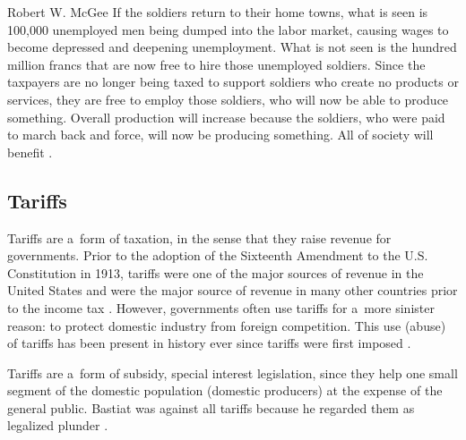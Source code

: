 \begin{artengenv}{Robert W. McGee}
If the soldiers return to their home towns, what is seen is 100,000 unemployed men being dumped into the labor market, causing wages to become depressed and deepening unemployment. What is not seen is the hundred million francs that are now free to hire those unemployed soldiers. Since the taxpayers are no longer being taxed to support soldiers who create no products or services, they are free to employ those soldiers, who will now be able to produce something. Overall production will increase because the soldiers, who were paid to march back and force, will now be producing something. All of society will benefit 
\parencite[][pp.6–7]{bastiat_selected_1964}.%




\subsection{Tariffs }



Tariffs are a~form of taxation, in the sense that they raise revenue for governments. Prior to the adoption of the Sixteenth Amendment to the U.S. Constitution in 1913, tariffs were one of the major sources of revenue in the United States and were the major source of revenue in many other countries prior to the income tax 
\parencite[][pp.269–270]{webber_history_1986}. %
 However, governments often use tariffs for a~more sinister reason: to protect domestic industry from foreign competition. This use (abuse) of tariffs has been present in history ever since tariffs were first imposed 
\parencite[][]{webber_history_1986}.%




Tariffs are a~form of subsidy, special interest legislation, since they help one small segment of the domestic population (domestic producers) at the expense of the general public. Bastiat was against all tariffs because he regarded them as legalized plunder 
\parencites[][]{bastiat_essais_1861}[][]{bastiat_libre-echange_1862}[][]{bastiat_correspondance_1862}[][]{bastiat_cobden_1864}[][]{bastiat_ce_1873}[][]{bastiat_sophismes_1873}[][]{bastiat_economic_1964}[][]{bastiat_economic_1964-1}[][]{bastiat_selected_1964}[][]{bastiat_law_1998}[][]{bastiat_bastiat_2007}.%





\end{artengenv}
